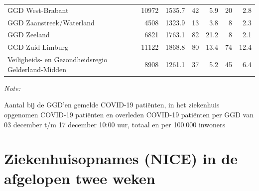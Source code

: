 \documentclass[
  english,
  man,floatsintext]{apa6}
\begin{document}
\begin{table}
\begin{threeparttable}
\begin{tabular}{lrrrrrr}
GGD West-Brabant & 10972 & 1535.7 & 42 & 5.9 & 20 & 2.8\\
GGD Zaanstreek/Waterland & 4508 & 1323.9 & 13 & 3.8 & 8 & 2.3\\
GGD Zeeland & 6821 & 1763.1 & 82 & 21.2 & 8 & 2.1\\
GGD Zuid-Limburg & 11122 & 1868.8 & 80 & 13.4 & 74 & 12.4\\
Veiligheids- en Gezondheidsregio Gelderland-Midden & 8908 & 1261.1 & 37 & 5.2 & 45 & 6.4\\
\bottomrule
\end{tabular}
\begin{tablenotes}
\item \textit{Note: } 
\item Aantal bij de GGD’en gemelde COVID-19 patiënten, in het ziekenhuis opgenomen COVID-19 patiënten en overleden COVID-19 patiënten per GGD van 03 december t/m 17 december 10:00 uur, totaal en per 100.000 inwoners
\end{tablenotes}
\end{threeparttable}
\endgroup{}
\end{table}

\newpage

\hypertarget{ziekenhuisopnames-nice-in-de-afgelopen-twee-weken}{%
\section{Ziekenhuisopnames (NICE) in de afgelopen twee weken}\label{ziekenhuisopnames-nice-in-de-afgelopen-twee-weken}}
\end{document}
